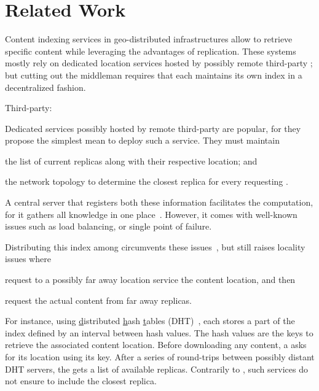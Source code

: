 
\section{Related Work}
\label{sec:related_work}

Content indexing services in geo-distributed infrastructures allow
\processes to retrieve specific content while leveraging the
advantages of replication. These systems mostly rely on dedicated
location services hosted by possibly remote third-party \processes; but
cutting out the middleman requires that each \process maintains its
own index in a decentralized fashion.

\begin{asparadesc}
\item [Third-party:]

Dedicated services possibly hosted by remote third-party \processes
are popular, for they propose the simplest mean to deploy such a
service. They must maintain
\begin{inparaenum}[(i)]
\item the list of current replicas along with their respective
  location; and
\item the network topology to determine the closest replica for every
  requesting \process.
\end{inparaenum}

\noindent A central server that registers both these information
facilitates the computation, for it gathers all knowledge in one
place~\cite{snamp, p2p-oracle, fogstore, p2p-alto}. However, it comes with
well-known issues such as load balancing, or single point of failure.

\noindent {} Distributing this index among
\processes circumvents these issues~\cite{voronet, ipfs, mdht,
  squirrel, coin_19}, but still raises locality issues where
\processes
\begin{inparaenum}[(i)]
\item request to a possibly far away location service the content
  location, and then
\item request the actual content from far away replicas.
\end{inparaenum}
For instance, using \underline{d}istributed \underline{h}ash
\underline{t}ables (DHT)~\cite{ipfs, mdht, squirrel}, each \process
stores a part of the index defined by an interval between hash values.
The hash values are the keys to retrieve the associated content
location.  Before downloading any content, a \node asks for its
location using its key. After a series of round-trips between possibly
distant DHT servers, the \node gets a list of available
replicas. Contrarily to \NAME, such services do not ensure to include
the closest replica.


\end{asparadesc}
